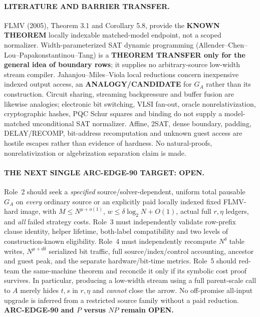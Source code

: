 \documentclass[11pt]{article}
\begin{document}
\paragraph{LITERATURE AND BARRIER TRANSFER.}
FLMV (2005), Theorem 3.1 and Corollary 5.8, provide the
\textbf{KNOWN THEOREM} locally indexable matched-model endpoint,
not a scoped normalizer.  Width-parameterized SAT dynamic programming
(Allender--Chen--Lou--Papakonstantinou--Tang) is a
\textbf{THEOREM TRANSFER only for the general idea of boundary rows};
it supplies no arbitrary-source low-width stream compiler.
Jahanjou--Miles--Viola local reductions concern inexpensive indexed
output access, an \textbf{ANALOGY/CANDIDATE} for $G_A$ rather than its
construction.  Circuit sharing, streaming backpressure and
buffer fusion are likewise analogies; electronic bit switching,
VLSI fan-out, oracle nonrelativization, cryptographic hashes,
PQC Schur squares and binding do not supply a model-matched
unconditional SAT normalizer.  Affine, 2SAT, dense boundary, padding,
DELAY/RECOMP, bit-address recomputation and unknown guest access are
hostile escapes rather than evidence of hardness.  No natural-proofs,
nonrelativization or algebrization separation claim is made.

\paragraph{THE NEXT SINGLE ARC-EDGE-90 TARGET: OPEN.}
Role~2 should seek a \emph{specified} source/solver-dependent,
uniform total pausable $G_A$ on \emph{every} ordinary source or
an explicitly paid locally indexed fixed FLMV-hard image, with
$M\le N^{\mu+o(1)}$, $w\le\delta\log_2 N+O(1)$,
actual full $r,\eta$ ledgers, and \emph{all} failed strategy costs.
Role~3 must independently validate row-prefix clause identity,
helper lifetime, both-label compatibility and two levels of
construction-known eligibility.  Role~4 must independently
recompute $N^{\delta}$ table writes, $N^{\mu+d\delta}$
serialized bit traffic, full source/index/control accounting,
ancestor and guest peak, and the separate hardware/bit-time
metrics.  Role~5 should red-team the same-machine theorem and
reconcile it only if its symbolic cost proof survives.
In particular, producing a low-width stream using a full
parent-scale call to $A$ merely hides $t,s$ in $r,\eta$ and
\emph{cannot} close the arrow.  No off-promise all-input upgrade is
inferred from a restricted source family without a paid reduction.
\textbf{ARC-EDGE-90 and $P$ versus $NP$ remain OPEN.}
\end{document}
